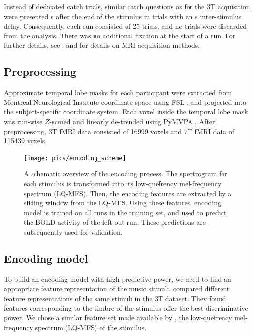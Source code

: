 Instead of dedicated catch trials, similar catch questions as for the 3T
acquisition were presented \unit[4]{s} after the end of the stimulus in trials
with an \unit[8]{s} inter-stimulus delay. Consequently, each run consisted of
25 trials, and no trials were discarded from the analysis.  There was no
additional fixation at the start of a run. For further details, see
\citet{HDH+2015}, and \citet{HBI+14} for details on MRI acquisition methods.


\subsection*{Preprocessing}

Approximate temporal lobe masks for each participant were extracted from
Montreal Neurological Institute coordinate space using FSL
\citep{SJB+04,JBB+12}, and projected into the subject-specific coordinate
system. 
Each voxel inside the temporal lobe mask was run-wise $Z$-scored and
linearly de-trended using PyMVPA \citep{HHS09b}. 
After preprocessing, 3T f{MRI} data consisted of 16999 voxels and 7T f{MRI} data of
115439 voxels.

\begin{figure}
  \centering
  \texttt{[image: pics/encoding\_scheme]}

  \caption{A schematic overview of the encoding process. The spectrogram for
    each stimulus is transformed into its low-quefrency mel-frequency spectrum
    (LQ-MFS). Then, the encoding features are extracted by a sliding window
    from the LQ-MFS. Using these features, encoding model is trained on all
    runs in the training set, and used to predict the BOLD activity of the
  left-out run.  These predictions are subsequently used for validation.}

 \label{fig:encoding_scheme}
\end{figure}

\subsection*{Encoding model}

To build an encoding model with high predictive power, we need to find an
appropriate feature representation of the music stimuli.  \citet{CTK+2012}
compared different feature representations of the same stimuli in the
3T dataset. They found features corresponding to the timbre of the
stimulus offer the best discriminative power. We chose a similar feature set made
available by \citet{HDH+2015}, the low-quefrency mel-frequency spectrum
(LQ-MFS) of the stimulus.

